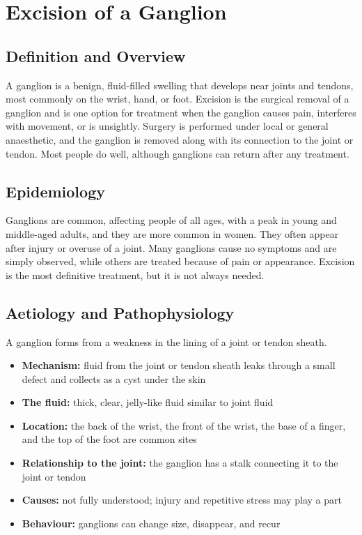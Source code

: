 \chapter{Excision of a Ganglion}

\section*{Definition and Overview}
A ganglion is a benign, fluid-filled swelling that develops near joints and tendons, most commonly on the wrist, hand, or foot. Excision is the surgical removal of a ganglion and is one option for treatment when the ganglion causes pain, interferes with movement, or is unsightly. Surgery is performed under local or general anaesthetic, and the ganglion is removed along with its connection to the joint or tendon. Most people do well, although ganglions can return after any treatment.

\section*{Epidemiology}
Ganglions are common, affecting people of all ages, with a peak in young and middle-aged adults, and they are more common in women. They often appear after injury or overuse of a joint. Many ganglions cause no symptoms and are simply observed, while others are treated because of pain or appearance. Excision is the most definitive treatment, but it is not always needed.

\section*{Aetiology and Pathophysiology}
A ganglion forms from a weakness in the lining of a joint or tendon sheath.
\begin{itemize}
    \item \textbf{Mechanism:} fluid from the joint or tendon sheath leaks through a small defect and collects as a cyst under the skin
    \item \textbf{The fluid:} thick, clear, jelly-like fluid similar to joint fluid
    \item \textbf{Location:} the back of the wrist, the front of the wrist, the base of a finger, and the top of the foot are common sites
    \item \textbf{Relationship to the joint:} the ganglion has a stalk connecting it to the joint or tendon
    \item \textbf{Causes:} not fully understood; injury and repetitive stress may play a part
    \item \textbf{Behaviour:} ganglions can change size, disappear, and recur
\end{itemize}

